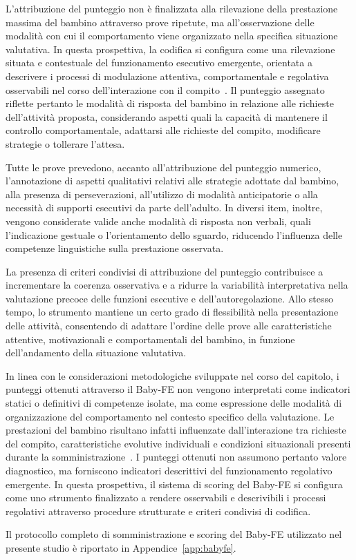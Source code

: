         L'attribuzione del punteggio non è finalizzata alla rilevazione della prestazione massima del bambino attraverso prove ripetute, ma all'osservazione delle modalità con cui il comportamento viene organizzato nella specifica situazione valutativa. In questa prospettiva, la codifica si configura come una rilevazione situata e contestuale del funzionamento esecutivo emergente, orientata a descrivere i processi di modulazione attentiva, comportamentale e regolativa osservabili nel corso dell'interazione con il compito~\cite{doebel2020}. Il punteggio assegnato riflette pertanto le modalità di risposta del bambino in relazione alle richieste dell'attività proposta, considerando aspetti quali la capacità di mantenere il controllo comportamentale, adattarsi alle richieste del compito, modificare strategie o tollerare l'attesa.

        Tutte le prove prevedono, accanto all'attribuzione del punteggio numerico, l'annotazione di aspetti qualitativi relativi alle strategie adottate dal bambino, alla presenza di perseverazioni, all'utilizzo di modalità anticipatorie o alla necessità di supporti esecutivi da parte dell'adulto. In diversi item, inoltre, vengono considerate valide anche modalità di risposta non verbali, quali l'indicazione gestuale o l'orientamento dello sguardo, riducendo l'influenza delle competenze linguistiche sulla prestazione osservata.

        La presenza di criteri condivisi di attribuzione del punteggio contribuisce a incrementare la coerenza osservativa e a ridurre la variabilità interpretativa nella valutazione precoce delle funzioni esecutive e dell'autoregolazione. Allo stesso tempo, lo strumento mantiene un certo grado di flessibilità nella presentazione delle attività, consentendo di adattare l'ordine delle prove alle caratteristiche attentive, motivazionali e comportamentali del bambino, in funzione dell'andamento della situazione valutativa.

        In linea con le considerazioni metodologiche sviluppate nel corso del capitolo, i punteggi ottenuti attraverso il Baby-FE non vengono interpretati come indicatori statici o definitivi di competenze isolate, ma come espressione delle modalità di organizzazione del comportamento nel contesto specifico della valutazione. Le prestazioni del bambino risultano infatti influenzate dall'interazione tra richieste del compito, caratteristiche evolutive individuali e condizioni situazionali presenti durante la somministrazione~\cite{blair2015}. I punteggi ottenuti non assumono pertanto valore diagnostico, ma forniscono indicatori descrittivi del funzionamento regolativo emergente. In questa prospettiva, il sistema di scoring del Baby-FE si configura come uno strumento finalizzato a rendere osservabili e descrivibili i processi regolativi attraverso procedure strutturate e criteri condivisi di codifica.

        Il protocollo completo di somministrazione e scoring del Baby-FE utilizzato nel presente studio è riportato in Appendice~\ref{app:babyfe}.
